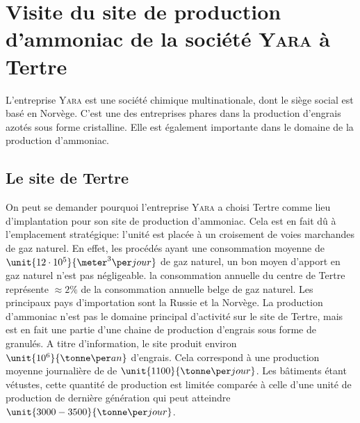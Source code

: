 \section{Visite du site de production d'ammoniac de la société \textsc{Yara} à Tertre}

L'entreprise \textsc{Yara} est une société chimique multinationale, dont le siège social est basé en Norvège. C'est une des entreprises phares dans la production d'engrais azotés sous forme cristalline. Elle est également importante dans le domaine de la production d'ammoniac.

\subsection{Le site de Tertre}
On peut se demander pourquoi l'entreprise \textsc{Yara} a choisi Tertre comme lieu d'implantation pour son site de production d'ammoniac. Cela est en fait dû à l'emplacement stratégique: l'unité est placée à un croisement de voies marchandes de gaz naturel. En effet, les procédés ayant une consommation moyenne de $\unit{12 \cdot 10^5}{\meter^3\per jour}$ de gaz naturel, un bon moyen d'apport en gaz naturel n'est pas négligeable. la consommation annuelle du centre de Tertre représente $\approx 2\%$ de la consommation annuelle belge de gaz naturel. Les principaux pays d'importation sont la Russie et la Norvège. La production d'ammoniac n'est pas le domaine principal d'activité sur le site de Tertre, mais est en fait une partie d'une chaine de production d'engrais sous forme de granulés. A titre d'information, le site produit environ $\unit{10^6}{\tonne\per an}$ d'engrais. Cela correspond à une production moyenne journalière de  de $\unit{1100}{\tonne\per jour}$. Les bâtiments étant vétustes, cette quantité de production est limitée comparée à celle d'une unité de production de dernière génération qui peut atteindre $\unit{3000-3500}{\tonne\per jour}$. 

